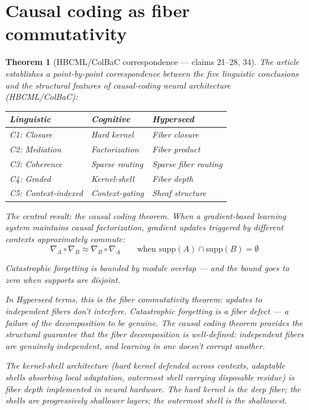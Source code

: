 \documentclass[11pt,a4paper]{article}
\newtheorem{theorem}[definition]{Theorem}
\begin{document}

\section{Causal coding as fiber commutativity}
\label{sec:causal}

\begin{theorem}[HBCML/ColBaC correspondence --- claims 21--28, 34]
\label{thm:causal}
The article establishes a point-by-point correspondence between
the five linguistic conclusions and the structural features of
causal-coding neural architecture (HBCML/ColBaC):

\begin{center}
\begin{tabular}{lll}
\textbf{Linguistic} & \textbf{Cognitive} & \textbf{Hyperseed} \\
\hline
C1: Closure & Hard kernel & Fiber closure \\
C2: Mediation & Factorization & Fiber product \\
C3: Coherence & Sparse routing & Sparse fiber routing \\
C4: Graded & Kernel-shell & Fiber depth \\
C5: Context-indexed & Context-gating & Sheaf structure \\
\end{tabular}
\end{center}

The central result: the \emph{causal coding theorem}. When a
gradient-based learning system maintains causal factorization,
gradient updates triggered by different contexts approximately
commute:
\[
  \nabla_{A} \circ \nabla_{B} \approx \nabla_{B} \circ \nabla_{A}
  \qquad \text{when } \text{supp}(A) \cap \text{supp}(B) = \emptyset
\]

Catastrophic forgetting is bounded by module overlap --- and the
bound goes to zero when supports are disjoint.

In Hyperseed terms, this is the \emph{fiber commutativity theorem}:
updates to independent fibers don't interfere. Catastrophic
forgetting is a \emph{fiber defect} --- a failure of the
decomposition to be genuine. The causal coding theorem provides the
structural guarantee that the fiber decomposition is well-defined:
independent fibers are genuinely independent, and learning in one
doesn't corrupt another.

The kernel-shell architecture (hard kernel defended across contexts,
adaptable shells absorbing local adaptation, outermost shell
carrying disposable residue) is fiber depth implemented in neural
hardware. The hard kernel is the deep fiber; the shells are
progressively shallower layers; the outermost shell is the shallowest.
\end{theorem}
\end{document}
